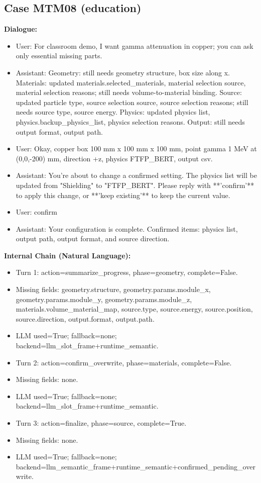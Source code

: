\documentclass[11pt]{ctexart}
\begin{document}
\subsection{Case MTM08 (education)}
\textbf{Dialogue:}
\begin{itemize}
\item User: For classroom demo, I want gamma attenuation in copper; you can ask only essential missing parts.
\item Assistant: Geometry: still needs geometry structure, box size along x. Materials: updated materials.selected\_materials, material selection source, material selection reasons; still needs volume-to-material binding. Source: updated particle type, source selection source, source selection reasons; still needs source type, source energy. Physics: updated physics list, physics.backup\_physics\_list, physics selection reasons. Output: still needs output format, output path.
\item User: Okay, copper box 100 mm x 100 mm x 100 mm, point gamma 1 MeV at (0,0,-200) mm, direction +z, physics FTFP\_BERT, output csv.
\item Assistant: You're about to change a confirmed setting. The physics list will be updated from "Shielding" to "FTFP\_BERT". Please reply with **'confirm'** to apply this change, or **'keep existing'** to keep the current value.
\item User: confirm
\item Assistant: Your configuration is complete. Confirmed items: physics list, output path, output format, and source direction.
\end{itemize}
\textbf{Internal Chain (Natural Language):}
\begin{itemize}
\item Turn 1: action=summarize\_progress, phase=geometry, complete=False.
\item Missing fields: geometry.structure, geometry.params.module\_x, geometry.params.module\_y, geometry.params.module\_z, materials.volume\_material\_map, source.type, source.energy, source.position, source.direction, output.format, output.path.
\item LLM used=True; fallback=none; backend=llm\_slot\_frame+runtime\_semantic.
\item Turn 2: action=confirm\_overwrite, phase=materials, complete=False.
\item Missing fields: none.
\item LLM used=True; fallback=none; backend=llm\_slot\_frame+runtime\_semantic.
\item Turn 3: action=finalize, phase=source, complete=True.
\item Missing fields: none.
\item LLM used=True; fallback=none; backend=llm\_semantic\_frame+runtime\_semantic+confirmed\_pending\_overwrite.
\end{itemize}
\end{document}
